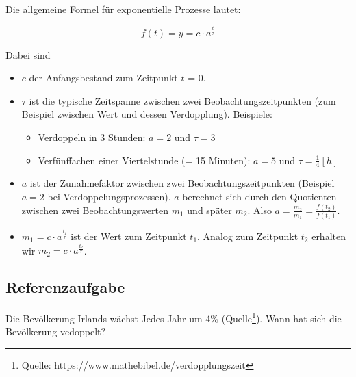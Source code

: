 Die allgemeine Formel für exponentielle Prozesse lautet:

$$f(t) = y = c\cdot{}a^{\frac{t}{\tau}}$$



Dabei sind
\begin{itemize}
\item $c$ der Anfangsbestand zum Zeitpunkt $t$ = 0.
\item $\tau$ ist die typische Zeitspanne zwischen zwei Beobachtungszeitpunkten (zum Beispiel zwischen Wert und dessen Verdopplung). Beispiele:
  \begin{itemize}
  \item Verdoppeln in 3 Stunden: $a=2$ und $\tau = 3$
  \item Verfünffachen einer Viertelstunde (= 15 Minuten): $a=5$ und $\tau=\frac{1}{4}[h]$
  \end{itemize}
\item $a$ ist der Zunahmefaktor zwischen zwei Beobachtungszeitpunkten (Beispiel $a=2$ bei Verdoppelungsprozessen).
  $a$ berechnet sich durch den Quotienten zwischen zwei Beobachtungswerten $m_1$ und später $m_2$. Also $a=\frac{m_2}{m_1}=\frac{f(t_2)}{f(t_1)}$.
\item $m_1=c\cdot{}a^{\frac{t_1}{\tau}}$ ist der Wert zum Zeitpunkt
  $t_1$. Analog zum Zeitpunkt $t_2$ erhalten wir
  $m_2=c\cdot{}a^{\frac{t_2}{\tau}}$. 
\end{itemize}
\newpage

\subsection{Referenzaufgabe}
Die Bevölkerung Irlands wächst Jedes Jahr um 4\% (Quelle\footnote{Quelle: https://www.mathebibel.de/verdopplungszeit}). Wann hat sich die Bevölkerung vedoppelt?

